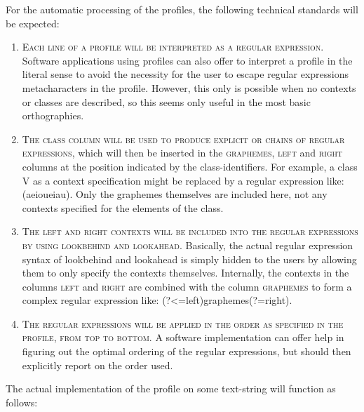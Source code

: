 For the automatic processing of the profiles, the following technical standards
will be expected:

\begin{enumerate}
	\def\labelenumi{\arabic{enumi}.} 
	\item \textsc{Each line of a profile will be interpreted as a regular expression. }Software applications using profiles can also offer to interpret a profile in the literal sense to avoid the necessity for the user to escape regular expressions metacharacters in the profile. However, this only is possible when no contexts or classes are described, so this seems only useful in the most basic orthographies. 
	\item \textsc{The \textsc{class} column will be used to produce explicit \textsc{or} chains of regular expressions}, which will then be inserted in the \textsc{graphemes}, \textsc{left} and \textsc{right} columns at the position indicated by the class-identifiers. For example, a class \textsc{V} as a context specification might be replaced by a regular expression like: (a\textbar{}e\textbar{}i\textbar{}o\textbar{}u\textbar{}ei\textbar{}au). Only the graphemes themselves are included here, not any contexts specified for the elements of the class. 
	\item \textsc{The \textsc{left} and \textsc{right} contexts will be included into the regular expressions by using lookbehind and lookahead}. Basically, the actual regular expression syntax of lookbehind and lookahead is simply hidden to the users by allowing them to only specify the contexts themselves. Internally, the contexts in the columns \textsc{left} and \textsc{right} are combined with the column \textsc{graphemes} to form a complex regular expression like: (?\textless{}=left)graphemes(?=right). 
	\item \textsc{The regular expressions will be applied in the order as specified in the profile, from top to bottom.} A software implementation can offer help in figuring out the optimal ordering of the regular expressions, but should then explicitly report on the order used. 
\end{enumerate}

The actual implementation of the profile on some text-string will function as
follows:

